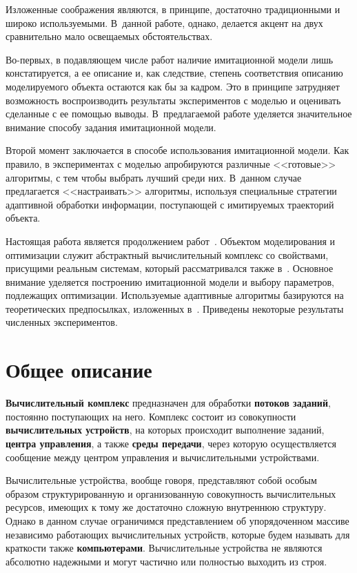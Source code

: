 \begin{multicols}{2}
  Изложенные соображения являются, в принципе, достаточно 
традиционными и широко используемыми. В~данной работе, однако, 
делается акцент на двух сравнительно мало освещаемых обстоятельствах.
  
  Во-первых, в подавляющем числе работ наличие имитационной модели 
лишь констатируется, а ее описание и, как следствие, степень соответствия 
описанию моделируемого объекта остаются как бы за кадром. Это в 
принципе затрудняет возможность воспроизводить результаты 
экспериментов с мо\-делью и оценивать сделанные с ее помощью выводы. 
В~предлагаемой работе уделяется значительное внимание способу задания 
имитационной модели.
  
  Второй момент заключается в способе использования имитационной 
модели. Как правило, в экспериментах с моделью апробируются различные 
<<готовые>> алгоритмы, с тем чтобы выбрать лучший среди них. В~данном 
случае предлагается <<настраивать>> алгоритмы, используя специальные 
стратегии адаптивной обработки информации, поступающей с имитируемых 
траекторий объекта.
  
  Настоящая работа является продолжением работ~\cite{1kon, 2kon}. Объектом 
моделирования и оптимизации служит абстрактный вычислительный 
комплекс со свойствами, присущими реальным системам, который 
рассматривался также в~\cite{3kon}. Основное внимание уделяется 
построению имитационной модели и выбору параметров, подлежащих 
оптимизации. Используемые адаптивные алгоритмы базируются на 
теоретических предпосылках, изложенных в~\cite{4kon}. Приведены 
некоторые результаты численных экспериментов.

\section{Общее описание}
   
   \textbf{Вычислительный комплекс} предназначен для 
обработки \textbf{потоков заданий}, постоянно поступающих на него. 
Комплекс состоит из совокупности \textbf{вычислительных 
устройств}, на которых происходит выполнение заданий, \textbf{центра 
управления}, а также \textbf{среды передачи}, через которую 
осуществляется сообщение между центром управления и вычислительными 
устрой\-ст\-вами.
   
   Вычислительные устройства, вообще говоря, представляют собой особым 
образом структурированную и организованную совокупность 
вычислительных ресурсов, имеющих к тому же достаточно сложную 
внутреннюю структуру. Однако в данном случае ограничимся 
представлением об упорядоченном массиве независимо работающих 
вычислительных устройств, которые будем называть для краткости также 
\textbf{компьютерами}. Вычислительные устройства не являются 
абсолютно надежными и могут частично или полностью выходить из строя.
   

\end{multicols}
